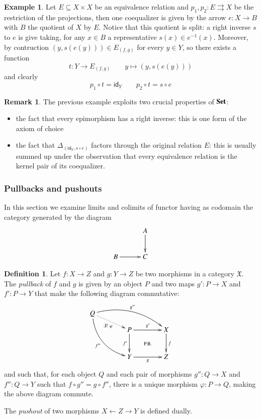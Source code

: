 \documentclass[12pt]{article}
\theoremstyle{definition}
\newtheorem{definition}[lemma]{Definition}
\newtheorem{remark}[lemma]{Remark}
\newtheorem{example}[lemma]{Example}
\def\X{\mathfrak X}
\newcommand{\Set}{\textbf{\textup{Set}}}
\numberwithin{equation}{section}
\newcommand{\id}[1]{\mathsf{id}_{#1}}
\begin{document}
\begin{example}\label{split_set}
Let $E\subseteq X\times X$ be an equivalence relation and $p_1, p_2:E\rightrightarrows X$ be the restriction of the projections, then one coequalizer is given by the arrow $e:X\rightarrow B$ with $B$ the quotient of $X$ by $E$. Notice that this quotient is split: a right inverse $s$ to $e$ is give taking, for any $x\in B$ a representative $s(x)\in e^{-1}(x)$. Moreover, by contruction $(y, s(e(y)))\in E_{(f,g)}$ for every $y\in Y$, so there exists a function
\[t:Y\rightarrow E_{(f,g)} \qquad y\mapsto (y, s(e(y))) \] 
and clearly
\[p_1\circ t=\id{Y}\qquad p_2\circ t=s\circ e\]
\end{example}



\begin{remark}\label{split_set2}
	The previous example exploits two crucial properties of $\Set$:
	\begin{itemize}
		\item the fact that every epimorphism has a right inverse: this is one form of the axiom of choice
		\item the fact that $\Delta_{(\id{Y},s\circ e)}$ factors through the original relation $E$: this is usually summed up under the observation that every equivalence relation is the kernel pair of its coequalizer.
	\end{itemize} 
\end{remark}
\subsubsection{Pullbacks and pushouts}
In this section we examine limits and colimits of functor having as codomain the category generated by the diagram
\[\xymatrix@C=30pt{
& A\ar[d]\\
B\ar[r]& C}
\]
\begin{definition}\label{pb}
Let $f\colon X\to Z$ and $g\colon Y\to Z$ be two morphisms in a category $\X$. The {\em pullback} of $f$ and $g$ is given by an object $P$ and two maps $g'\colon P\to X$ and $f'\colon P\to Y$ that make the following diagram commutative:
\begin{equation}\label{pullback_eq}
\xymatrix@R=10pt@C=40pt{
Q\ar@{.>}[dr]_{\exists!\ \varphi}\ar@/_-15pt/[rrd]^{g''}\ar@/_15pt/[rddd]_{f''}\\
&P\ar@{}[ddr]|-{\text{P.B.}}\ar[dd]_{f'}\ar[r]^{g'}&X\ar[dd]^f\\
\\
&Y\ar[r]_g&Z
}
\end{equation}
and such that, for each object $Q$ and each pair of morphisms $g''\colon Q\to X$ and $f''\colon Q\to Y$ such that $f\circ g''=g\circ f''$, there is a unique morphism $\varphi\colon P\to Q$, making the above diagram commute. 

The {\em pushout} of two morphisms $X\leftarrow Z\to Y$ is defined dually. %
\end{definition}
\end{document}
